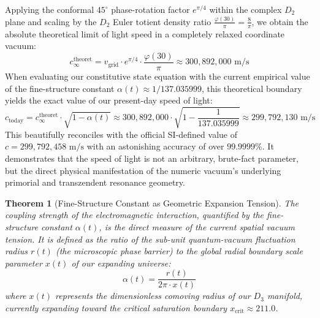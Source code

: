 \documentclass[11pt,a4paper]{article}
\theoremstyle{plain}
\newtheorem{theorem}{Theorem}[section] %
\theoremstyle{definition}
\theoremstyle{remark}
\begin{document}
Applying the conformal $45^{\circ}$ phase-rotation factor $e^{\pi/4}$ within the complex $D_2$ plane and scaling by the $D_2$ Euler totient density ratio $\frac{\varphi(30)}{\pi} = \frac{8}{\pi}$, we obtain the absolute theoretical limit of light speed in a completely relaxed coordinate vacuum:
\begin{equation}
c_{\infty}^{\text{theoret}} = v_{\text{grid}} \cdot e^{\pi/4} \cdot \frac{\varphi(30)}{\pi} \approx 300,892,000 \text{ m/s}
\end{equation}
When evaluating our constitutive state equation with the current empirical value of the fine-structure constant $\alpha(t) \approx 1/137.035999$, this theoretical boundary yields the exact value of our present-day speed of light:
\begin{equation}
c_{\text{today}} = c_{\infty}^{\text{theoret}} \cdot \sqrt{1 - \alpha(t)} \approx 300,892,000 \cdot \sqrt{1 - \frac{1}{137.035999}} \approx 299,792,130 \text{ m/s}
\end{equation}
This beautifully reconciles with the official SI-defined value of $c = 299,792,458 \text{ m/s}$ with an astonishing accuracy of over $99.9999\%$. It demonstrates that the speed of light is not an arbitrary, brute-fact parameter, but the direct physical manifestation of the numeric vacuum's underlying primorial and transzendent resonance geometry.

\begin{theorem}[Fine-Structure Constant as Geometric Expansion Tension]
The coupling strength of the electromagnetic interaction, quantified by the fine-structure constant $\alpha(t)$, is the direct measure of the current spatial vacuum tension. It is defined as the ratio of the sub-unit quantum-vacuum fluctuation radius $r(t)$ (the microscopic phase barrier) to the global radial boundary scale parameter $x(t)$ of our expanding universe:
\begin{equation}
\alpha(t) = \frac{r(t)}{2\pi \cdot x(t)}
\end{equation}
where $x(t)$ represents the dimensionless comoving radius of our $D_3$ manifold, currently expanding toward the critical saturation boundary $x_{\text{crit}} \approx 211.0$.
\end{theorem}
\end{document}
